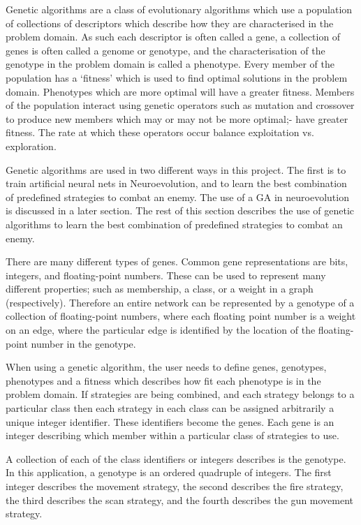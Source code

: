 Genetic algorithms are a class of evolutionary algorithms which use a population of collections of descriptors which describe how they are characterised in the problem domain. As such each descriptor is often called a gene, a collection of genes is often called a genome or genotype, and the characterisation of the genotype in the problem domain is called a phenotype. Every member of the population has a `fitness' which is used to find optimal solutions in the problem domain. Phenotypes which are more optimal will have a greater fitness. Members of the population interact using genetic operators such as mutation and crossover to produce new members which may or may not be more optimal;- have greater fitness. The rate at which these operators occur balance exploitation vs. exploration.

Genetic algorithms are used in two different ways in this project. The first is to train artificial neural nets in Neuroevolution, and to learn the best combination of predefined strategies to combat an enemy. The use of a GA in neuroevolution is discussed in a later section. The rest of this section describes the use of genetic algorithms to learn the best combination of predefined strategies to combat an enemy.

There are many different types of genes. Common gene representations are bits, integers, and floating-point numbers. These can be used to represent many different properties; such as membership, a class, or a weight in a graph (respectively). Therefore an entire network can be represented by a genotype of a collection of floating-point numbers, where each floating point number is a weight on an edge, where the particular edge is identified by the location of the floating-point number in the genotype.


When using a genetic algorithm, the user needs to define genes, genotypes, phenotypes and a fitness which describes how fit each phenotype is in the problem domain. If strategies are being combined, and each strategy belongs to a particular class then each strategy in each class can be assigned arbitrarily a unique integer identifier. These identifiers become the genes. Each gene is an integer describing which member within a particular class of strategies to use.

A collection of each of the class identifiers or integers describes is the genotype. In this application, a genotype is an ordered quadruple of integers. The first integer describes the movement strategy, the second describes the fire strategy, the third describes the scan strategy, and the fourth describes the gun movement strategy.

